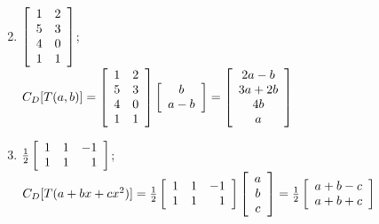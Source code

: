 \begin{multicols}{1}
\begin{ex}
\begin{enumerate}[label={\alph*.}]
\end{enumerate}
\begin{sol}
\begin{enumerate}[label={\alph*.}]
\setcounter{enumi}{1}
\item $\left[ \begin{array}{cc} 1 & 2 \\ 5 & 3 \\ 4 & 0 \\ 1 & 1 \end{array} \right]$; \\ $C_D[T(a, b)] = \left[ \begin{array}{cc} 1 & 2 \\ 5 & 3 \\ 4 & 0 \\ 1 & 1 \end{array} \right]\left[ \begin{array}{cc} b \\ a - b \end{array} \right] = \left[ \begin{array}{c} 2a - b \\ 3a + 2b \\ 4b \\ a \end{array} \right]$


\setcounter{enumi}{3}
\item $\tfrac{1}{2}\left[ \begin{array}{rrr} 1 & 1 & -1 \\ 1 & 1 & 1 \end{array} \right]$; $C_D[T(a + bx + cx^2)] = \tfrac{1}{2}\left[ \begin{array}{rrr} 1 & 1 & -1 \\ 1 & 1 & 1 \end{array} \right]\left[ \begin{array}{c} a \\ b \\ c \end{array} \right] = \tfrac{1}{2}\left[ \begin{array}{c} a + b - c \\ a + b + c \end{array} \right]$



\end{enumerate}
\end{sol}
\end{ex}
\end{multicols}
